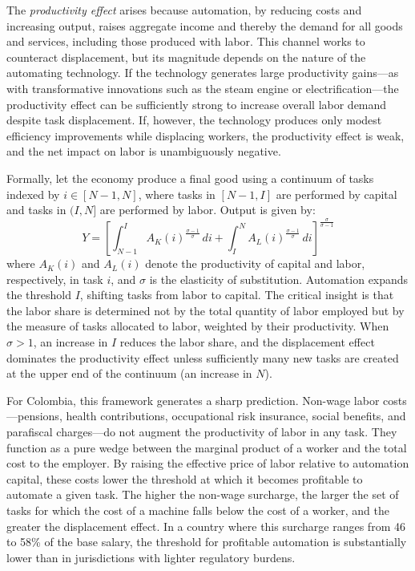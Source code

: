 \documentclass{article}
\begin{document}
The \textit{productivity effect} arises because automation, by reducing costs and increasing output, raises aggregate income and thereby the demand for all goods and services, including those produced with labor. This channel works to counteract displacement, but its magnitude depends on the nature of the automating technology. If the technology generates large productivity gains---as with transformative innovations such as the steam engine or electrification---the productivity effect can be sufficiently strong to increase overall labor demand despite task displacement. If, however, the technology produces only modest efficiency improvements while displacing workers, the productivity effect is weak, and the net impact on labor is unambiguously negative.

Formally, let the economy produce a final good using a continuum of tasks indexed by $i \in [N-1, N]$, where tasks in $[N-1, I]$ are performed by capital and tasks in $(I, N]$ are performed by labor. Output is given by:
\begin{equation}
Y = \left[\int_{N-1}^{I} A_K(i)^{\frac{\sigma-1}{\sigma}} \, di + \int_{I}^{N} A_L(i)^{\frac{\sigma-1}{\sigma}} \, di \right]^{\frac{\sigma}{\sigma-1}}
\label{eq:task_production}
\end{equation}
where $A_K(i)$ and $A_L(i)$ denote the productivity of capital and labor, respectively, in task $i$, and $\sigma$ is the elasticity of substitution. Automation expands the threshold $I$, shifting tasks from labor to capital. The critical insight is that the labor share is determined not by the total quantity of labor employed but by the measure of tasks allocated to labor, weighted by their productivity. When $\sigma > 1$, an increase in $I$ reduces the labor share, and the displacement effect dominates the productivity effect unless sufficiently many new tasks are created at the upper end of the continuum (an increase in $N$).

For Colombia, this framework generates a sharp prediction. Non-wage labor costs---pensions, health contributions, occupational risk insurance, social benefits, and parafiscal charges---do not augment the productivity of labor in any task. They function as a pure wedge between the marginal product of a worker and the total cost to the employer. By raising the effective price of labor relative to automation capital, these costs lower the threshold at which it becomes profitable to automate a given task. The higher the non-wage surcharge, the larger the set of tasks for which the cost of a machine falls below the cost of a worker, and the greater the displacement effect. In a country where this surcharge ranges from 46 to 58\% of the base salary, the threshold for profitable automation is substantially lower than in jurisdictions with lighter regulatory burdens.
\end{document}
